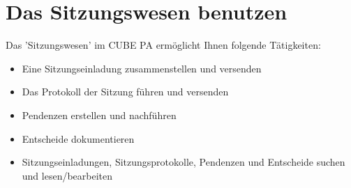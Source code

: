 
\clearpage
\section{Das Sitzungswesen benutzen}

Das 'Sitzungswesen' im CUBE PA ermöglicht Ihnen folgende Tätigkeiten:


\begin{itemize}
\item
Eine Sitzungseinladung zusammenstellen und versenden
\item
Das Protokoll der Sitzung führen und versenden
\item
Pendenzen erstellen und nachführen
\item
Entscheide dokumentieren
\item
Sitzungseinladungen, Sitzungsprotokolle, Pendenzen und Entscheide suchen und lesen/bearbeiten
\end{itemize}

\vspace{2cm}

